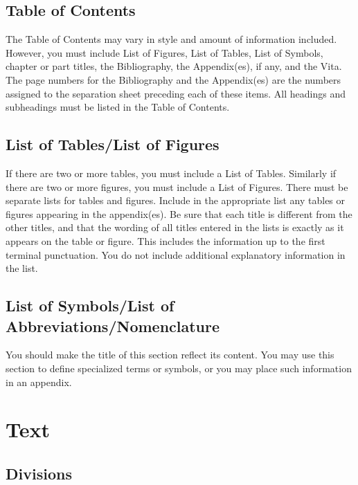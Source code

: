 \subsection{Table of Contents}
\label{sec:TableOfContents}

The Table of Contents may vary in style and amount of
information included. However, you must include List of Figures, List
of Tables, List of Symbols, chapter or part titles, the Bibliography,
the Appendix(es), if any, and the Vita. The page numbers for the
Bibliography and the Appendix(es) are the numbers assigned to the
separation sheet preceding each of these items. All headings and
subheadings must be listed in the Table of Contents.

\subsection{List of Tables/List of Figures}
\label{sec:ListOfTables/ListOfFigures}

If there are two or more tables, you must include a List of Tables.
Similarly if there are two or more figures, you must include a List of
Figures. There must be separate lists for tables and figures. Include
in the appropriate list any tables or figures appearing in the
appendix(es). Be sure that each title is different from the other
titles, and that the wording of all titles entered in the lists is
exactly as it appears on the table or figure.  This includes the
information up to the first terminal punctuation.  You do not include
additional explanatory information in the list.

\subsection{List of Symbols/List of Abbreviations/Nomenclature}
\label{sec:ListOfSymbols/ListOfAbbreviations/Nomenclature}

You should make the title of this section reflect its content. You may
use this section to define specialized terms or symbols, or you may
place such information in an appendix.

\section{Text}
\label{sec:Text}

\subsection{Divisions}
\label{sec:Divisions}


